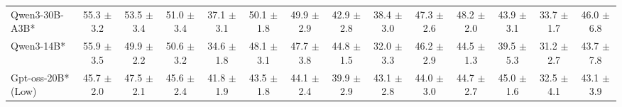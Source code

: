 \documentclass{llmxive}
\begin{document}
\begin{table}[hbt]
{\begin{tabular}{l *{13}{c}}


 
\rowcolor{gray!10}
Qwen3-30B-A3B* &
55.3 {\tiny$\pm$ 3.2} &
53.5 {\tiny$\pm$ 3.4} &
51.0 {\tiny$\pm$ 3.4} &
37.1 {\tiny$\pm$ 3.1} &
50.1 {\tiny$\pm$ 1.8} &
49.9 {\tiny$\pm$ 2.9} &
42.9 {\tiny$\pm$ 2.8} &
38.4 {\tiny$\pm$ 3.0} &
47.3 {\tiny$\pm$ 2.6} &
48.2 {\tiny$\pm$ 2.0} &
43.9 {\tiny$\pm$ 3.1} &
33.7 {\tiny$\pm$ 1.7} &
46.0 {\tiny$\pm$ 6.8} \\

 

Qwen3-14B* &
55.9 {\tiny$\pm$ 3.5} &
49.9 {\tiny$\pm$ 2.2} &
50.6 {\tiny$\pm$ 3.2} &
34.6 {\tiny$\pm$ 1.8} &
48.1 {\tiny$\pm$ 3.1} &
47.7 {\tiny$\pm$ 3.8} &
44.8 {\tiny$\pm$ 1.5} &
32.0 {\tiny$\pm$ 3.3} &
46.2 {\tiny$\pm$ 2.9} &
44.5 {\tiny$\pm$ 1.3} &
39.5 {\tiny$\pm$ 5.3} &
31.2 {\tiny$\pm$ 2.7} &
43.7 {\tiny$\pm$ 7.8} \\
\rowcolor{gray!10}
Gpt-oss-20B* (Low) &
45.7 {\tiny$\pm$ 2.0}&
47.5 {\tiny$\pm$ 2.1}&
45.6 {\tiny$\pm$ 2.4}&
41.8 {\tiny$\pm$ 1.9}&
43.5 {\tiny$\pm$ 1.8}&
44.1 {\tiny$\pm$ 2.4}&
39.9 {\tiny$\pm$ 2.9}&
43.1 {\tiny$\pm$ 2.8}&
44.0 {\tiny$\pm$ 3.0}&
44.7 {\tiny$\pm$ 2.7}&
45.0 {\tiny$\pm$ 1.6}&
32.5 {\tiny$\pm$ 4.1}&
43.1 {\tiny$\pm$ 3.9}\\	



\end{tabular}}
\end{table}
\end{document}
